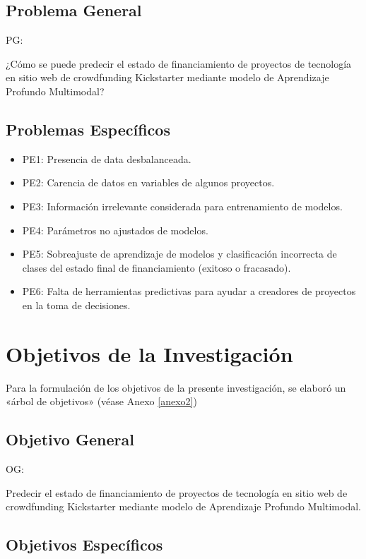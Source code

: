 \subsection{Problema General}
PG: \newcommand{\ProblemaGeneral}{
¿Cómo se puede predecir el estado de financiamiento de proyectos de tecnología en sitio web de crowdfunding Kickstarter mediante modelo de Aprendizaje Profundo Multimodal?
}
\ProblemaGeneral
\subsection{Problemas Específicos}
\newcommand{\Pbone}{
Presencia de data desbalanceada.
}
\newcommand{\Pbtwo}{
Carencia de datos en variables de algunos proyectos.
}
\newcommand{\Pbthree}{
Información irrelevante considerada para entrenamiento de modelos.
}
\newcommand{\Pbfour}{
Parámetros no ajustados de modelos.
}
\newcommand{\Pbfive}{
Sobreajuste de aprendizaje de modelos y clasificación incorrecta de clases del estado final de financiamiento (exitoso o fracasado).
}
\newcommand{\Pbsix}{
Falta de herramientas predictivas para ayudar a creadores de proyectos en la toma de decisiones.
}

\begin{itemize}
	\item PE1: {\Pbone}
	\item PE2: {\Pbtwo}
	\item PE3: {\Pbthree}
	\item PE4: {\Pbfour}
	\item PE5: {\Pbfive}
	\item PE6: {\Pbsix}
\end{itemize}

\section{Objetivos de la Investigación}
Para la formulación de los objetivos de la presente investigación, se elaboró un «árbol de objetivos» (véase Anexo \ref{anexo2}) 
\subsection{Objetivo General}
OG: \newcommand{\ObjetivoGeneral}{
Predecir el estado de financiamiento de proyectos de tecnología en sitio web de crowdfunding Kickstarter mediante modelo de Aprendizaje Profundo Multimodal.
}
\ObjetivoGeneral
\subsection{Objetivos Específicos}
\newcommand{\Objone}{
Utilizar técnicas de Machine Learning para trabajar con data desbalanceada.
}
\newcommand{\Objtwo}{
Imputar datos faltantes o incompletos de proyectos.
}
\newcommand{\Objthree}{
Definir información relevante para entrenamiento de modelos.
}
\newcommand{\Objfour}{
Ajustar parámetros de modelos.
}
\newcommand{\Objfive}{
Evitar sobreajuste de aprendizaje del modelo y clasificación incorrecta de clases del estado final de financiamiento (exitoso o fracasado).
}
\newcommand{\Objsix}{
Ofrecer herramienta analítica y predictiva a creadores de proyectos para ayudar en la toma de decisiones.
}

